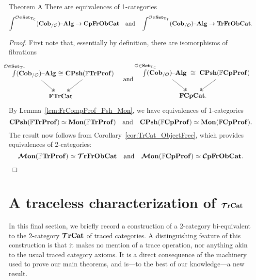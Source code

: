 \documentclass[11pt,oneside,article]{memoir}
\begin{document}
\begin{named}{Theorem A}
    \label{thm:TheoremA}
  There are equivalences of 1-categories
  \begin{equation*}
    \int^{\mathcal{O}\in\mathbf{Set}_{\mathbf{T}_{\mathsf{C}}}}(\mathbf{Cob}_{/\mathcal{O}}){\text \textendash}\mathbf{Alg} \to \mathbf{CpFrObCat}
    \quad\text{and}\quad
    \int^{\mathcal{O}\in\mathbf{Set}_{\mathbf{T}_{\mathsf{T}}}}(\mathbf{Cob}_{/\mathcal{O}}){\text \textendash}\mathbf{Alg} \to \mathbf{TrFrObCat}.
  \end{equation*}
\end{named}
\begin{proof}
  First note that, essentially by definition, there are isomorphisms of fibrations
  \begin{equation*}
    \begin{tikzcd}[column sep=-2em]
      \int\limits^{\mathclap{\LabSet\in\Set_{\TT}}}(\LCob{\LabSet})\alg
          \ar[rr,phantom,"\iso"] \ar[dr,two heads]
        && \CPsh(\dFrTrProf) \ar[dl,two heads] \\
      & \FrTrCat &
    \end{tikzcd}
    \quad\text{and}\quad
    \begin{tikzcd}[column sep=-2em]
      \int\limits^{\mathclap{\LabSet\in\Set_{\TC}}}(\LCob{\LabSet})\alg
          \ar[rr,phantom,"\iso"] \ar[dr,two heads]
        && \CPsh(\dFrCompProf) \ar[dl,two heads] \\
      & \FrCompCat. &
    \end{tikzcd}
  \end{equation*}
  By Lemma~\ref{lem:FrCompProf_Psh_Mon}, we have equivalences of 1-categories
  \begin{equation}
    \mathbf{CPsh}(\mathbb{F}\mathbf{TrProf})\simeq\mathbf{Mon}(\mathbb{F}\mathbf{TrProf})
    \quad\text{and}\quad
    \mathbf{CPsh}(\mathbb{F}\mathbf{CpProf})\simeq\mathbf{Mon}(\mathbb{F}\mathbf{CpProf}).
  \end{equation}
  The result now follows from Corollary~\ref{cor:TrCat_ObjectFree}, which provides equivalences of
  2-categories:
  \[
    \bm{\mathcal{M}}\mathbf{on}(\mathbb{F}\mathbf{TrProf})\simeq\bm{\mathcal{T}}\mathbf{rFrObCat}
    \quad\text{and}\quad
    \bm{\mathcal{M}}\mathbf{on}(\mathbb{F}\mathbf{CpProf})\simeq\bm{\mathcal{C}}\mathbf{pFrObCat}. \qedhere
  \]
\end{proof}

\section{A traceless characterization of \texorpdfstring{$\bm{\mathcal{T}}\mathbf{rCat}$}{TrCat}}
  \label{sec:characterization_of_traced}

In this final section, we briefly record a construction of a 2-category bi-equivalent to the
2-category $\bm{\mathcal{T}}\mathbf{rCat}$ of traced categories. A distinguishing feature of this construction is that it
makes no mention of a trace operation, nor anything akin to the usual traced category axioms. It is
a direct consequence of the machinery used to prove our main theorems, and is---to the best of our
knowledge---a new result.
\end{document}
